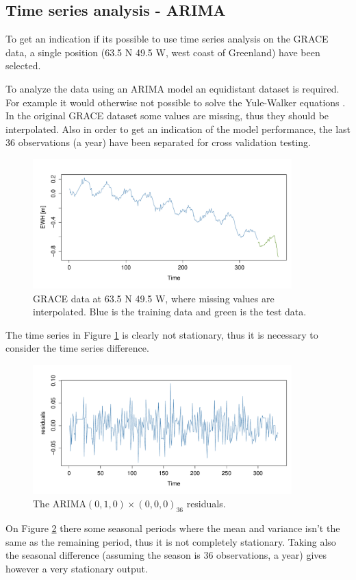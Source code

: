 
\subsection{Time series analysis - ARIMA}

To get an indication if its possible to use time series analysis on the GRACE data, a single position (63.5 N 49.5 W, west coast of Greenland) have been selected.

To analyze the data using an ARIMA model an equidistant dataset is required. For example it would otherwise not possible to solve the Yule-Walker equations \cite[s.~122]{time-series-analysis}. In the original GRACE dataset some values are missing, thus they should be interpolated. Also in order to get an indication of the model performance, the last 36 observations (a year) have been separated for cross validation testing.

\begin{figure}[H]
\centering
\includegraphics[height=5cm]{figures/ts-initial-split}
\caption{GRACE data at 63.5 N 49.5 W, where missing values are interpolated. Blue is the training data and green is the  test data.}
\label{fig:ts-initial-split}
\end{figure}

The time series in Figure \ref{fig:ts-initial-split} is clearly not stationary, thus it is necessary to consider the time series difference.
\begin{figure}[H]
\centering
\includegraphics[height=5cm]{figures/ts-residual-i1s0}
\caption{The ARIMA$(0,1,0) \times (0,0,0)_{36}$ residuals.}
\label{fig:ts-residual-i1s0}
\end{figure}
On Figure \ref{fig:ts-residual-i1s0} there some seasonal periods where the mean and variance isn't the same as the remaining period, thus it is not completely stationary. Taking also the seasonal difference (assuming the season is 36 observations, a year) gives however a very stationary output.

